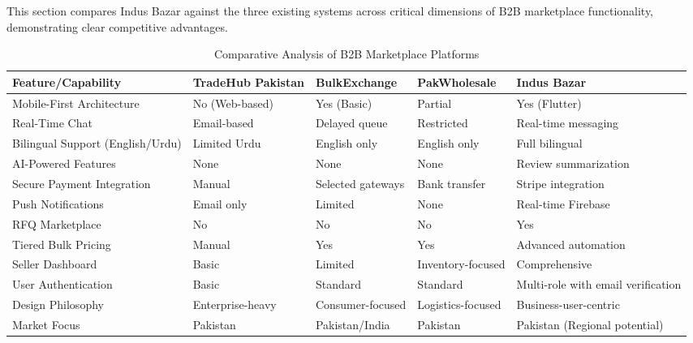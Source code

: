This section compares Indus Bazar against the three existing systems across critical dimensions of B2B marketplace functionality, demonstrating clear competitive advantages.

\begin{table}[H]
\centering
\caption{Comparative Analysis of B2B Marketplace Platforms}
\label{tab:system_comparison}
\renewcommand{\arraystretch}{1.4}
\footnotesize
\begin{tabular}{|>{\raggedright}p{2.8cm}|>{\raggedright}p{2cm}|>{\raggedright}p{2cm}|>{\raggedright}p{2cm}|>{\raggedright\arraybackslash}p{2.2cm}|}
\hline
\rowcolor{lightgray}
\textbf{Feature/Capability} & \textbf{TradeHub Pakistan} & \textbf{BulkExchange} & \textbf{PakWholesale} & \textbf{Indus Bazar} \\
\hline

Mobile-First Architecture & No (Web-based) & Yes (Basic) & Partial & Yes (Flutter) \\
\hline

Real-Time Chat & Email-based & Delayed queue & Restricted & Real-time messaging \\
\hline

Bilingual Support (English/Urdu) & Limited Urdu & English only & English only & Full bilingual \\
\hline

AI-Powered Features & None & None & None & Review summarization \\
\hline

Secure Payment Integration & Manual & Selected gateways & Bank transfer & Stripe integration \\
\hline

Push Notifications & Email only & Limited & None & Real-time Firebase \\
\hline

RFQ Marketplace & No & No & No & Yes \\
\hline

Tiered Bulk Pricing & Manual & Yes & Yes & Advanced automation \\
\hline

Seller Dashboard & Basic & Limited & Inventory-focused & Comprehensive \\
\hline

User Authentication & Basic & Standard & Standard & Multi-role with email verification \\
\hline

Design Philosophy & Enterprise-heavy & Consumer-focused & Logistics-focused & Business-user-centric \\
\hline

Market Focus & Pakistan & Pakistan/India & Pakistan & Pakistan (Regional potential) \\
\hline

\end{tabular}
\end{table}

